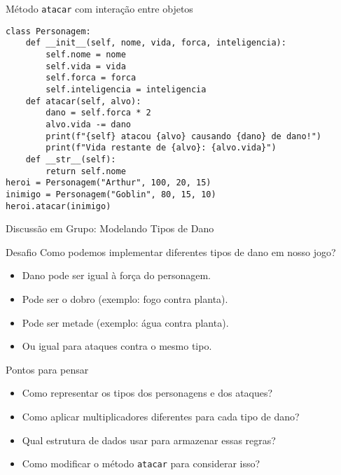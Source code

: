\begin{frame}[fragile]{Método \texttt{atacar} com interação entre objetos}

    \begin{verbatim}
class Personagem:
    def __init__(self, nome, vida, forca, inteligencia):
        self.nome = nome
        self.vida = vida
        self.forca = forca
        self.inteligencia = inteligencia
    def atacar(self, alvo):
        dano = self.forca * 2
        alvo.vida -= dano
        print(f"{self} atacou {alvo} causando {dano} de dano!")
        print(f"Vida restante de {alvo}: {alvo.vida}")
    def __str__(self):
        return self.nome
heroi = Personagem("Arthur", 100, 20, 15)
inimigo = Personagem("Goblin", 80, 15, 10)
heroi.atacar(inimigo)
\end{verbatim}

\end{frame}

\begin{frame}{Discussão em Grupo: Modelando Tipos de Dano}

    \begin{block}{Desafio}
        Como podemos implementar diferentes tipos de dano em nosso jogo?

        \begin{itemize}
            \item Dano pode ser igual à força do personagem.
            \item Pode ser o dobro (exemplo: fogo contra planta).
            \item Pode ser metade (exemplo: água contra planta).
            \item Ou igual para ataques contra o mesmo tipo.
        \end{itemize}


        \begin{block}{Pontos para pensar}
            \begin{itemize}
                \item Como representar os tipos dos personagens e dos ataques?
                \item Como aplicar multiplicadores diferentes para cada tipo de dano?
                \item Qual estrutura de dados usar para armazenar essas regras?
                \item Como modificar o método \texttt{atacar} para considerar isso?
            \end{itemize}
        \end{block}

    \end{block}

\end{frame}


